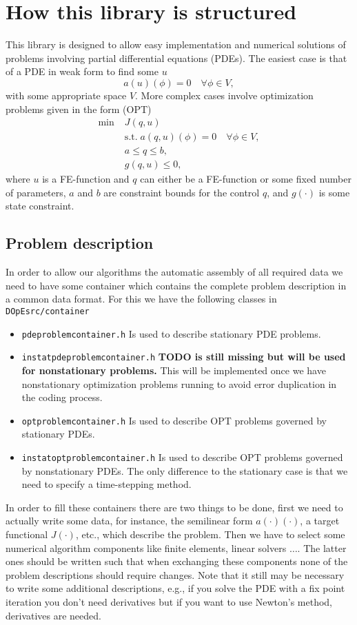 \section{How this library is structured}
This library is designed to allow easy implementation and numerical solutions 
of problems involving partial differential equations (PDEs). The easiest case 
is that of a PDE in weak form to find some $u$
\[
a(u)(\phi) = 0 \quad \forall \phi \in V,
\]
with some appropriate space $V$.
More complex cases involve optimization problems given in the form (OPT)
\begin{align*}
\min\;&J(q,u) \\
  &\text{s.t.}\; a(q,u)(\phi) = 0 \quad \forall \phi\in V,\\
  &a \le q \le b,\\
  &g(q,u) \le 0,  
\end{align*}
where $u$ is a FE-function and $q$ can either be a FE-function or some 
fixed number of parameters, $a$ and $b$ are constraint bounds for the control $q$,
and $g(\cdot)$ is some state constraint.


\subsection{Problem description}
In order to allow our algorithms the automatic assembly of all required 
data we need to have some container which contains the complete problem 
description in a common data format. For this we have the following 
classes in \texttt{DOpEsrc/container}
\begin{itemize}
  \item \texttt{pdeproblemcontainer.h} Is used to describe  stationary PDE problems.
  \item \texttt{instatpdeproblemcontainer.h} {\bf TODO is still missing but will be used for nonstationary problems.} This will be implemented once we have nonstationary optimization problems running to avoid error duplication in the coding process.
  \item \texttt{optproblemcontainer.h} Is used to describe  OPT problems governed by 
    stationary PDEs. 
  \item \texttt{instatoptproblemcontainer.h} Is used to describe  OPT problems governed by nonstationary PDEs. The only difference to the stationary case is that we need to specify a time-stepping method.  
\end{itemize}
In order to fill these containers there are two things to be done,
first we need to actually write some data, for instance,
the semilinear form $a(\cdot)(\cdot)$, a target functional $J(\cdot)$, etc.,
which describe the problem. Then we have to select some numerical 
algorithm components like finite elements, linear solvers $\ldots$.
The latter ones should be written such that when exchanging these components
none of the problem descriptions should require changes. 
Note that it still may be necessary to write some additional descriptions, 
e.g., if you solve the PDE with a fix point iteration you don't need derivatives
but if you want to use Newton's method, derivatives are needed.

